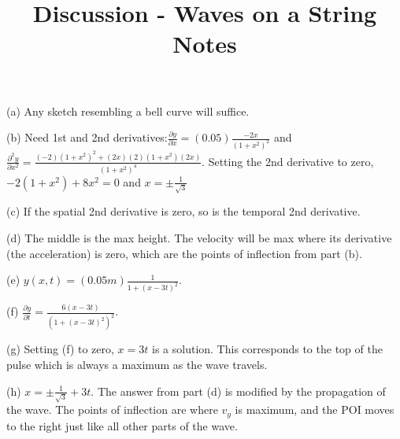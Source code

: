 \documentclass[10pt]{article}
\newenvironment{problem}[2][Problem]{\begin{trivlist}
\item[\hskip \labelsep {\bfseries #1}\hskip \labelsep {\bfseries #2.}]}{\end{trivlist}}
\begin{document}
 \title{Discussion - Waves on a String Notes}
\date{}
\maketitle

\begin{problem}{1}

\item (a) Any sketch resembling a bell curve will suffice.
\item (b) Need 1st and 2nd derivatives:$\frac{\partial y}{\partial x} = (0.05) \frac{-2x}{(1+x^2)^2}$ and $\frac{\partial^2y}{\partial x^2}=\frac{(-2)(1+x^2)^2 +(2x)(2)(1+x^2)(2x)}{(1+x^2)^4}$. Setting the 2nd derivative to zero, $-2(1+x^2) + 8x^2=0$ and $x=\pm \frac{1}{\sqrt{3}}$
\item (c) If the spatial 2nd derivative is zero, so is the temporal 2nd derivative.
\item (d) The middle is the max height. The velocity will be max where its derivative (the acceleration) is zero, which are the points of inflection from part (b).
\item (e) $y(x, t)=(0.05m)\frac{1}{1+(x-3t)^2}$.
\item (f) $\frac{\partial y}{ \partial t}=\frac{6(x-3t)}{(1+(x-3t)^2)^2}$.
\item (g) Setting (f) to zero, $x=3t$ is a solution. This corresponds to the top of the pulse which is always a maximum as the wave travels.
\item (h) $x=\pm \frac{1}{\sqrt{3}}+3t$. The answer from part (d) is modified by the propagation of the wave. The points of inflection are where $v_y$ is maximum, and the POI moves to the right just like all other parts of the wave.


\end{problem}








\end{document}
